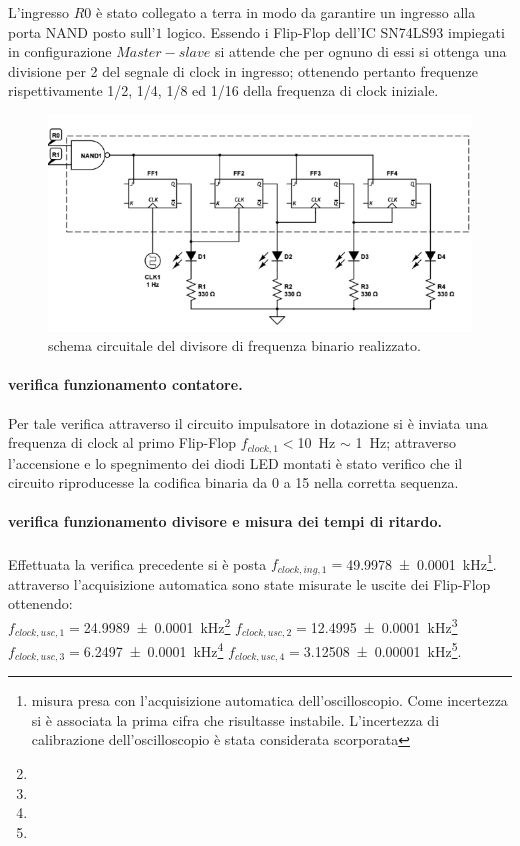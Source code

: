 	L'ingresso $R0$ è stato collegato a terra in modo da garantire un ingresso alla porta NAND posto sull'$1$ logico.
	Essendo i Flip-Flop dell'IC SN74LS93  impiegati in configurazione $Master-slave$ 
	si attende che per ognuno di essi si ottenga una divisione per 2 del segnale di clock in ingresso; ottenendo pertanto frequenze rispettivamente 1/2, 1/4, 1/8 ed 1/16 della frequenza di
	clock iniziale.
	\begin{figure}[htb]
		\centering
		\includegraphics[scale=0.5]{../Figs-Tabs/divisori.png}
		\caption{schema circuitale del divisore di frequenza binario realizzato.}
		\label{f:div1}
	\end{figure}
\paragraph{verifica funzionamento contatore.}
	Per tale verifica attraverso il circuito impulsatore in dotazione 
	si è inviata una frequenza di clock al primo Flip-Flop $f_{clock,1}<$\SI{10}{\hertz} $\sim$ \SI{1}{\hertz};
	attraverso l'accensione e lo spegnimento dei diodi LED montati è stato verifico che il circuito riproducesse la codifica binaria da 0 a 15 nella corretta sequenza.
\paragraph{verifica funzionamento divisore e misura dei tempi di ritardo.}
	Effettuata la verifica precedente si è posta $f_{clock,ing,1}=$\SI{49.9978 \pm 0.0001}{ \kilo \hertz}\footnote{misura presa con l'acquisizione automatica dell'oscilloscopio. Come incertezza si è associata la prima cifra che risultasse instabile. L'incertezza di calibrazione dell'oscilloscopio è stata considerata scorporata}.
	attraverso l'acquisizione automatica sono state misurate le uscite dei Flip-Flop ottenendo:\\
	$f_{clock,usc,1}=$\SI{24.9989 \pm 0.0001}{ \kilo \hertz}\footnote[1]{ } \qquad
	$f_{clock,usc,2}=$\SI{12.4995 \pm 0.0001}{ \kilo \hertz}\footnote[1]{ }\\
	$f_{clock,usc,3}=$\SI{ 6.2497 \pm 0.0001}{ \kilo \hertz}\footnote[1]{ }\qquad
	$f_{clock,usc,4}=$\SI{3.12508 \pm 0.00001}{ \kilo \hertz}\footnote[1]{ }.\\
	
